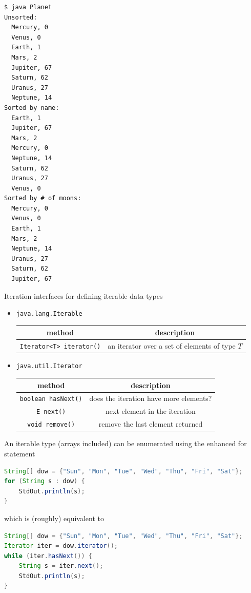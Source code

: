 \documentclass[8pt,a4paper,compress]{beamer}
\begin{document}
\begin{frame}[fragile]
\pause

\begin{lstlisting}[language={}]
$ java Planet
Unsorted:
  Mercury, 0
  Venus, 0
  Earth, 1
  Mars, 2
  Jupiter, 67
  Saturn, 62
  Uranus, 27
  Neptune, 14
Sorted by name:
  Earth, 1
  Jupiter, 67
  Mars, 2
  Mercury, 0
  Neptune, 14
  Saturn, 62
  Uranus, 27
  Venus, 0
Sorted by # of moons:
  Mercury, 0
  Venus, 0
  Earth, 1
  Mars, 2
  Neptune, 14
  Uranus, 27
  Saturn, 62
  Jupiter, 67
\end{lstlisting}
\end{frame}

\begin{frame}[fragile]
\pause

Iteration interfaces for defining iterable data types
\begin{itemize}
\item \lstinline{java.lang.Iterable}
\begin{center}
\begin{tabular}{cc}
method & description \\ \hline
\lstinline$Iterator<T> iterator()$ & an iterator over a set of elements of type $T$
\end{tabular} 
\end{center}

\item \lstinline{java.util.Iterator}
\begin{center}
\begin{tabular}{cc}
method & description \\ \hline
\lstinline$boolean hasNext()$ & does the iteration have more elements? \\
\lstinline$E next()$ & next element in the iteration \\
\lstinline$void remove()$ & remove the last element returned
\end{tabular} 
\end{center}
\end{itemize}

\pause
\bigskip

An iterable type (arrays included) can be enumerated using the enhanced for statement
\begin{lstlisting}[language=Java]
String[] dow = {"Sun", "Mon", "Tue", "Wed", "Thu", "Fri", "Sat"};
for (String s : dow) {
    StdOut.println(s);
}
\end{lstlisting}
which is (roughly) equivalent to
\begin{lstlisting}[language=Java]
String[] dow = {"Sun", "Mon", "Tue", "Wed", "Thu", "Fri", "Sat"};
Iterator iter = dow.iterator();
while (iter.hasNext()) {
    String s = iter.next();
    StdOut.println(s);
}
\end{lstlisting}
\end{frame}
\end{document}
